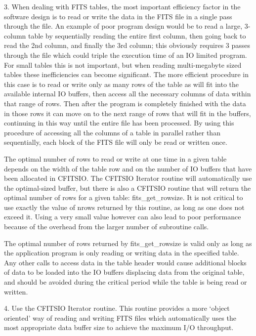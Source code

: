 \documentclass[11pt]{book}
\begin{document}
3.  When dealing with FITS tables, the most important efficiency factor
in the software design is to read or write the data in the FITS file in
a single pass through the file.  An example of poor program design
would be to read a large, 3-column table by sequentially reading the
entire first column, then going back to read the 2nd column, and
finally the 3rd column; this obviously requires 3 passes through the
file which could triple the execution time of an IO limited program.
For small tables this is not important, but when reading multi-megabyte
sized tables these inefficiencies can become significant.  The more
efficient procedure in this case is to read or write only as many rows
of the table as will fit into the available internal IO buffers, then
access all the necessary columns of data within that range of rows.
Then after the program is completely finished with the data in those
rows it can move on to the next range of rows that will fit in the
buffers, continuing in this way until the entire file has been
processed.  By using this procedure of accessing all the columns of a
table in parallel rather than sequentially, each block of the FITS file
will only be read or written once.

The optimal number of rows to read or write at one time in a given
table depends on the width of the table row and on the number of IO
buffers that have been allocated in CFITSIO.  The CFITSIO Iterator routine
will automatically use the optimal-sized buffer, but there is also a
CFITSIO routine that will return the optimal number of rows for a given
table:  fits\_get\_rowsize.  It is not critical to use exactly the
value of nrows returned by this routine, as long as one does not exceed
it.  Using a very small value however can also lead to poor performance
because of the overhead from the larger number of subroutine calls.

The optimal number of rows returned by fits\_get\_rowsize is valid only
as long as the application program is only reading or writing data in
the specified table.  Any other calls to access data in the table
header would  cause additional blocks of data
to be loaded into the IO buffers displacing data from the original
table, and should be avoided during the critical period while the table
is being read or written.

4.  Use the CFITSIO Iterator routine.  This routine provides a
more `object oriented' way of reading and writing FITS files
which automatically uses the most appropriate data buffer size
to achieve the maximum I/O throughput.
\end{document}
